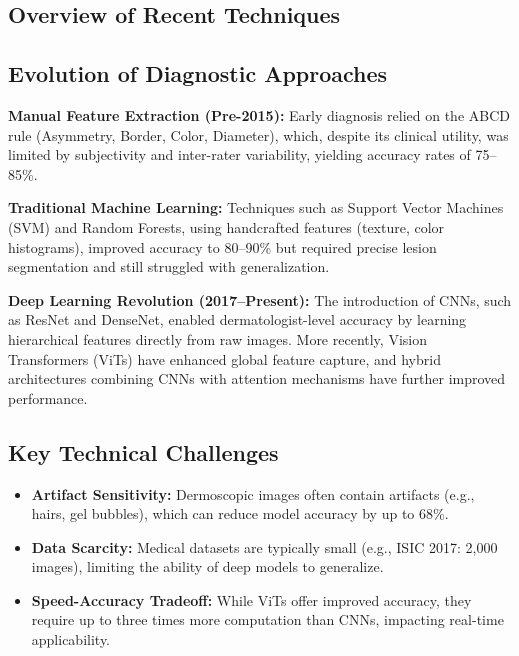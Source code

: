 \documentclass[a4paper,12pt]{report}
\begin{document}
\begin{spacing}{1.5}
    \section{Overview of Recent Techniques}
    
    \subsection*{Evolution of Diagnostic Approaches}
    
    \textbf{Manual Feature Extraction (Pre-2015):}  
    Early diagnosis relied on the ABCD rule (Asymmetry, Border, Color, Diameter), which, despite its clinical utility, was limited by subjectivity and inter-rater variability, yielding accuracy rates of 75–85\%.
    
    \textbf{Traditional Machine Learning:}  
    Techniques such as Support Vector Machines (SVM) and Random Forests, using handcrafted features (texture, color histograms), improved accuracy to 80–90\% but required precise lesion segmentation and still struggled with generalization.
    
    \textbf{Deep Learning Revolution (2017–Present):}  
    The introduction of CNNs, such as ResNet and DenseNet, enabled dermatologist-level accuracy by learning hierarchical features directly from raw images. More recently, Vision Transformers (ViTs) have enhanced global feature capture, and hybrid architectures combining CNNs with attention mechanisms have further improved performance.
    
    \subsection*{Key Technical Challenges}
    
    \begin{itemize}
        \item \textbf{Artifact Sensitivity:} Dermoscopic images often contain artifacts (e.g., hairs, gel bubbles), which can reduce model accuracy by up to 68\%.
        \item \textbf{Data Scarcity:} Medical datasets are typically small (e.g., ISIC 2017: 2,000 images), limiting the ability of deep models to generalize.
        \item \textbf{Speed-Accuracy Tradeoff:} While ViTs offer improved accuracy, they require up to three times more computation than CNNs, impacting real-time applicability.
    \end{itemize}
    

\end{spacing}
\end{document}
